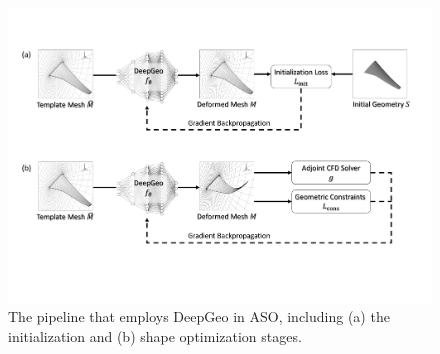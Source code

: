 
\begin{figure}[tbh]
    \begin{center}
        \includegraphics[width=1\linewidth]{chapter5/fig/pipeline.pdf}
    \end{center}
    \vspace{-3mm}
    \caption{
        \small The pipeline that employs DeepGeo in ASO, including (a) the initialization and (b) shape optimization stages.
    }
    \label{ch5:fig:pipeline}
\end{figure}